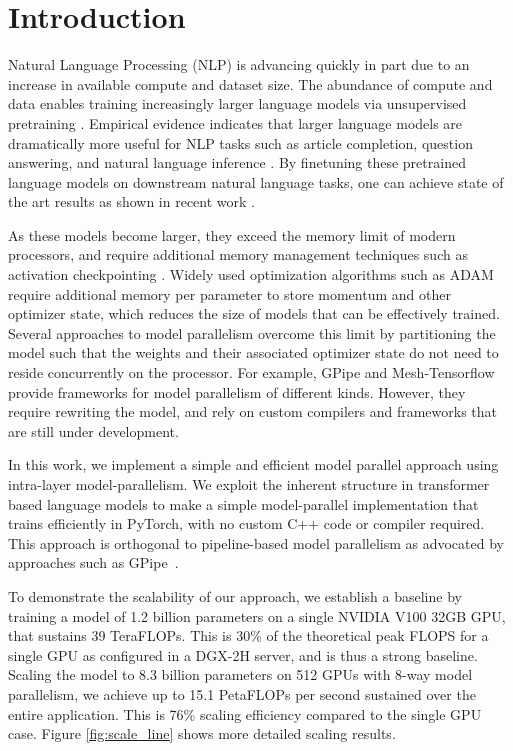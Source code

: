 \documentclass{article}
\begin{document}
\section{Introduction}

Natural Language Processing (NLP) is advancing quickly in part due to an increase in available compute and dataset size. The abundance of compute and data enables training increasingly larger language models via unsupervised pretraining \citep{devlin2018bert,Radford2019GPT2}. Empirical evidence indicates that larger language models are dramatically more useful for NLP tasks such as article completion, question answering, and natural language inference \cite{ALBERT2019,T5}. By finetuning these pretrained language models on downstream natural language tasks, one can achieve state of the art results as shown in recent work \cite{devlin2018bert, ELMo, Howard2018ULMFIT, Radford2018GPT, Radford2017Sentiment, Le2016seq2seqtransfer, roberta,transformerxl,xlnet,mtdnn,ALBERT2019}. 
    
As these models become larger, they exceed the memory limit of modern processors, and require additional memory management techniques such as activation checkpointing \citep{activation_checkpointing}. Widely used optimization algorithms such as ADAM require additional memory per parameter to store momentum and other optimizer state, which reduces the size of models that can be effectively trained. Several approaches to model parallelism overcome this limit by partitioning the model such that the weights and their associated optimizer state do not need to reside concurrently on the processor. For example, GPipe \cite{GPipe} and Mesh-Tensorflow \cite{mesh_tf} provide frameworks for model parallelism of different kinds. However, they require rewriting the model, and rely on custom compilers and frameworks that are still under development.
    
In this work,  we implement a simple and efficient model parallel approach using intra-layer model-parallelism. We exploit the inherent structure in transformer based language models to make a simple model-parallel implementation that trains efficiently in PyTorch, with no custom C++ code or compiler required. This approach is orthogonal to pipeline-based model parallelism as advocated by approaches such as GPipe~\cite{GPipe}. 
    
To demonstrate the scalability of our approach, we establish a baseline by training a model of 1.2 billion parameters on a single NVIDIA V100 32GB GPU, that sustains 39 TeraFLOPs. This is 30\% of the theoretical peak FLOPS for a single GPU as configured in a DGX-2H server, and is thus a strong baseline. Scaling the model to 8.3 billion parameters on 512 GPUs with 8-way model parallelism, we achieve up to 15.1 PetaFLOPs per second sustained over the entire application. This is 76\% scaling efficiency compared to the single GPU case. Figure \ref{fig:scale_line} shows more detailed scaling results.
    
\end{document}
